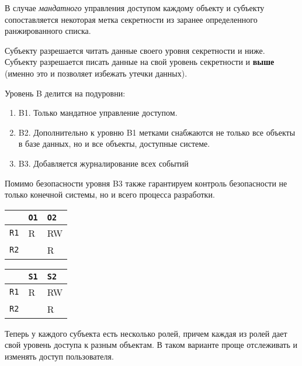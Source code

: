 \begin{definition}
  В случае \textit{мандатного} управления доступом каждому объекту и субъекту
  сопоставляется некоторая метка секретности из заранее определенного
  ранжированного списка.
  
  Субъекту разрешается читать данные своего уровня секретности и ниже. Субъекту
  разрешается писать данные на свой уровень секретности и \textbf{выше} (именно
  это и позволяет избежать утечки данных).
\end{definition}

Уровень B делится на подуровни:

\begin{enumerate}
\item
  B1. Только мандатное управление доступом.

\item
  B2. Дополнительно к уровню B1 метками снабжаются не только все объекты в базе
  данных, но и все объекты, доступные системе.

\item
  B3. Добавляется журналирование всех событий
\end{enumerate}


Помимо безопасности уровня B3 также гарантируем контроль безопасности не только
конечной системы, но и всего процесса разработки.


\begin{minipage}{0.15 \textwidth}
  \centering

  \begin{tabularx}{0.9 \textwidth}{ X | X  X }
                & \texttt{O1} & \texttt{O2} \\ \hline
    \texttt{R1} & R           & RW          \\
    \texttt{R2} &             & R           \\
  \end{tabularx}
\end{minipage}%
\hspace{0.05 \textwidth}%
\begin{minipage}{0.15 \textwidth}
  \centering

  \begin{tabularx}{0.9 \textwidth}{ X | X  X }
                & \texttt{S1} & \texttt{S2} \\ \hline
    \texttt{R1} & R           & RW          \\
    \texttt{R2} &             & R           \\
  \end{tabularx}
\end{minipage}%
\hspace{0.05 \textwidth}%
\begin{minipage}{0.6 \textwidth}
  Теперь у каждого субъекта есть несколько ролей, причем каждая из ролей дает
  свой уровень доступа к разным объектам. В таком варианте проще отслеживать
  и изменять доступ пользователя.
\end{minipage}

